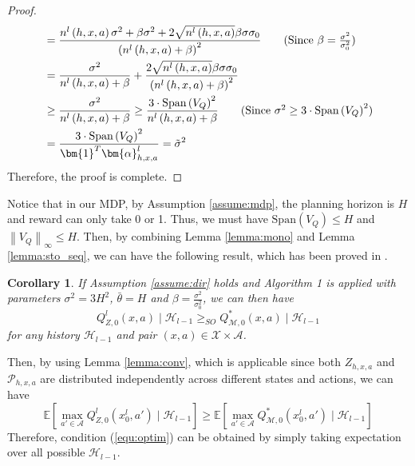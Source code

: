 \documentclass[letterpaper]{article} %
\newcommand{\Sp}[1]{\left(#1\right)}
\newcommand{\Mp}[1]{\left[#1\right]}
\newcommand{\Norm}[1]{\left\|#1\right\|}
\newcommand{\E}{\mathbb{E}}
\newcommand{\M}{\mathcal{M}}
\newcommand{\nls}{n^l\Sp{h, x, a}}
\newtheorem{corollary}{Corollary}
\theoremstyle{definition}
\begin{document}
\begin{proof}
\begin{align*}
	&=\frac{\nls\sigma^2+\beta\sigma^2+2\sqrt{\nls}\beta\sigma\sigma_0}{\Sp{\nls+\beta}^2}\tag{Since $\beta=\frac{\sigma^2}{\sigma_0^2}$}\\
	&=\frac{\sigma^2}{\nls+\beta}+\frac{2\sqrt{\nls}\beta\sigma\sigma_0}{\Sp{\nls+\beta}^2}\\
	&\geq\frac{\sigma^2}{\nls+\beta}\geq\frac{3\cdot\text{Span}\Sp{V_Q}^2}{\nls+\beta}\tag{Since $\sigma^2\geq 3\cdot\text{Span}\Sp{V_Q}^2$}\\
	&= \frac{3\cdot\text{Span}\Sp{V_Q}^2}{\bm{1}^T\bm{\alpha}^l_{h, x, a}}=\tilde{\sigma}^2
	\end{align*}
	Therefore, the proof is complete.
\end{proof}

Notice that in our MDP, by Assumption \ref{assume:mdp}, the planning horizon is $H$ and reward can only take 0 or 1. Thus, we must have $\text{Span}\Sp{V_Q}\leq H$ and $\Norm{V_Q}_{\infty}\leq H$. Then, by combining Lemma \ref{lemma:mono} and Lemma \ref{lemma:sto_seq}, we can have the following result, which has been proved in \cite{osband2017deep}.
\begin{corollary}
	If Assumption \ref{assume:dir} holds and Algorithm 1 is applied with parameters $\sigma^2=3H^2$, $\bar{\theta}=H$ and $\beta=\frac{\sigma^2}{\sigma_0^2}$, we can then have
	$$Q^l_{Z, 0}\Sp{x, a}\mid\mathcal{H}_{l-1}\geq_{SO}Q^*_{\M, 0}\Sp{x, a}\mid\mathcal{H}_{l-1}$$
	for any history $\mathcal{H}_{l-1}$ and pair $\Sp{x, a}\in\mathcal{X}\times\mathcal{A}$.
\end{corollary}

Then, by using Lemma \ref{lemma:conv}, which is applicable since both $Z_{h, x, a}$ and $\mathcal{P}_{h, x, a}$ are distributed independently across different states and actions, we can have
$$\E\Mp{\max_{a'\in\mathcal{A}}Q^l_{Z, 0}\Sp{x^l_0, a'}\mid\mathcal{H}_{l-1}}\geq\E\Mp{\max_{a'\in\mathcal{A}}Q^*_{\M, 0}\Sp{x^l_0, a'}\mid\mathcal{H}_{l-1}}$$
Therefore, condition (\ref{equ:optim}) can be obtained by simply taking expectation over all possible $\mathcal{H}_{l-1}$.
\end{document}
